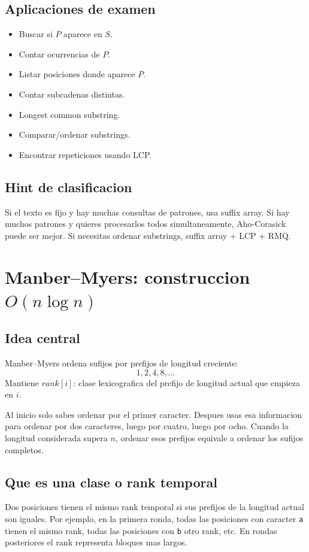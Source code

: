 \documentclass[10pt]{article}
\newcommand{\bigO}{O}
\begin{document}
\subsection{Aplicaciones de examen}
\begin{itemize}[leftmargin=*]
\item Buscar si $P$ aparece en $S$.
\item Contar ocurrencias de $P$.
\item Listar posiciones donde aparece $P$.
\item Contar subcadenas distintas.
\item Longest common substring.
\item Comparar/ordenar substrings.
\item Encontrar repeticiones usando LCP.
\end{itemize}

\subsection{Hint de clasificacion}
Si el texto es fijo y hay muchas consultas de patrones, usa suffix array. Si hay
muchos patrones y quieres procesarlos todos simultaneamente, Aho-Corasick puede
ser mejor. Si necesitas ordenar substrings, suffix array + LCP + RMQ.

\newpage
\section{Manber--Myers: construccion $\bigO(n\log n)$}

\subsection{Idea central}
Manber--Myers ordena sufijos por prefijos de longitud creciente:
\[
1,2,4,8,\ldots
\]
Mantiene $rank[i]$: clase lexicografica del prefijo de longitud actual que
empieza en $i$.

Al inicio solo sabes ordenar por el primer caracter. Despues usas esa
informacion para ordenar por dos caracteres, luego por cuatro, luego por ocho.
Cuando la longitud considerada supera $n$, ordenar esos prefijos equivale a
ordenar los sufijos completos.

\subsection{Que es una clase o rank temporal}
Dos posiciones tienen el mismo rank temporal si sus prefijos de la longitud
actual son iguales. Por ejemplo, en la primera ronda, todas las posiciones con
caracter \texttt{a} tienen el mismo rank, todas las posiciones con
\texttt{b} otro rank, etc. En rondas posteriores el rank representa bloques mas
largos.
\end{document}

